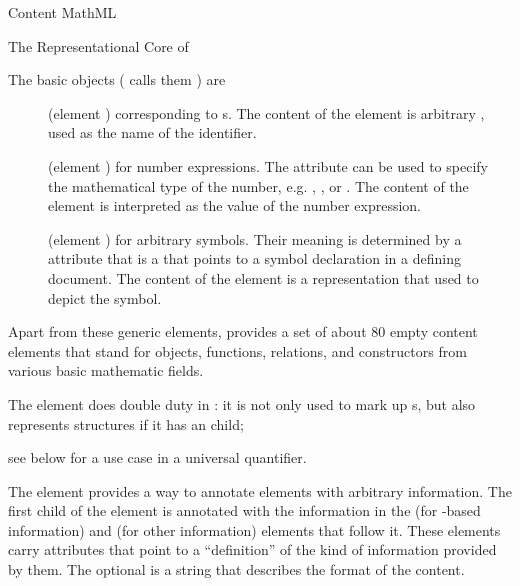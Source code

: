 \begin{omgroup}[id=mobj,short=Mathematical Objects]
\begin{omgroup}[id=cmml]{Content MathML}
\begin{module}[id=cMathML]
\begin{omgroup}[id=mathml-core]{The Representational Core of {\cmathml}}
\begin{definition}[display=flow,id=mml.basic.def]
  The basic objects ({\mathml} calls them ) are
\begin{description}
  \item[{}] (element ) corresponding to
    {s}. The content of the  element is
    arbitrary {\pmathml}, used as the name of the identifier.
  \item[{}] (element ) for number
    expressions. The attribute  can be used to specify the
    mathematical type of the number, e.g. {}, {}, or
    {}. The content of the  element is
    interpreted as the value of the number expression.
  \item[{}] (element ) for arbitrary
    symbols.  Their meaning is determined by a {} attribute that
    is a {} that points to a symbol declaration in a defining
    document. The content of the  element is a {\pmathml}
    representation that used to depict the symbol.
  \end{description}
\end{definition}

Apart from these generic elements, {\cmathml} provides a set of about 80 empty
content elements that stand for objects, functions, relations, and constructors
from various basic mathematic fields.

\begin{definition}[id=apply.def]
  The {} element does double duty in {\cmathml}: it is not only
  used to mark up {s}, but also represents {}
  structures if it has an {} child;
\end{definition}
see {} below for a use case in a universal quantifier.

\begin{definition}[id=semantics.def]
  The {} element provides a way to annotate {\cmathml} elements
  with arbitrary information. The first child of the 
  element is annotated with the information in the {} (for
  {\xml}-based information) and {} (for other information)
  elements that follow it. These elements carry
   attributes that point to a
  ``definition'' of the kind of information provided by them. The optional
   is a string that describes the format of
  the content.
\end{definition}
\end{omgroup}


\end{module}
\end{omgroup}
\end{omgroup}
